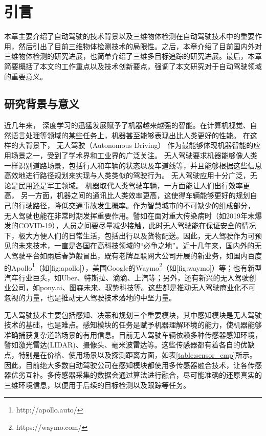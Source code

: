 \chapter{引言}
\label{ch:intro}

本章主要介绍了自动驾驶的技术背景以及三维物体检测在自动驾驶技术中的重要作用，然后引出了目前三维物体检测技术的局限性。之后，本章介绍了目前国内外对三维物体检测的研究进展，也简单介绍了三维多目标追踪的研究进展。最后，本章简要概括了本文的工作重点以及技术创新要点，强调了本文研究对于自动驾驶领域的重要意义。

\section{研究背景与意义}
\label{sec:background}
近几年来， 深度学习的迅猛发展赋予了机器越来越强的智能。在计算机视觉、自然语言处理等领域的某些任务上，机器甚至能够表现出比人类更好的性能\cite{he2016deep,DevlinBERT}。 在这样的大背景下， 无人驾驶（Autonomous Driving） 作为最能够体现机器智能的应用场景之一，受到了学术界和工业界的广泛关注。 无人驾驶要求机器能够像人类一样识别道路场景，包括行人和车辆的状态以及车道线等，并且能够根据这些信息高效地进行路径规划来实现与人类类似的驾驶行为。 无人驾驶应用十分广泛，无论是民用还是军工领域。 机器取代人类驾驶车辆，一方面能让人们出行效率更高， 另一方面，机器之间的通讯比人类效率更高，这使得车辆能够更好的规划自己的行驶路径，降低交通事故发生概率。作为智慧城市的不可缺少的组成部分， 无人驾驶也能在非常时期发挥重要作用。譬如在面对重大传染病时（如2019年末爆发的COVID-19），人员之间要尽量减少接触，此时无人驾驶能在保证安全的情况下，极大方便人们的日常生活，包括出行以及货物配送。因此，无人驾驶作为可预见的未来技术，一直是各国在高科技领域的“必争之地”。近十几年来，国内外的无人驾驶平台如雨后春笋般冒出，既有老牌互联网大公司开展的新业务，如国内百度的Apollo\footnote[1]{http://apollo.auto/}（如\figurename \ref{fig:apollo}），美国Google的Waymo\footnote[2]{https://waymo.com/}（如\figurename \ref{fig:waymo}）等；也有新型汽车行业巨头，如Uber、特斯拉、滴滴、上汽等；另外，还有新兴的无人驾驶创业公司，如pony.ai、图森未来、驭势科技等。这些都是推动无人驾驶商业化不可忽视的力量，也是推动无人驾驶技术落地的中坚力量。



无人驾驶技术主要包括感知、决策和规划三个重要模块，其中感知模块是无人驾驶技术的基础，也是难点。感知模块的任务是赋予机器理解环境的能力，使机器能够准确捕获复杂道路场景的有用信息。目前无人驾驶车辆依赖多种传感器感知环境， 譬如激光雷达(LIDAR)、摄像头、毫米波雷达等。这些传感器都有着各自的优缺点，特别是在价格、使用场景以及探测距离方面，如表\ref{table:sensor_cmp}所示。因此，目前绝大多数自动驾驶公司在感知模块都使用多传感器融合技术，让各传感器优劣互补。多传感器采集的数据会通过算法进行融合，尽可能准确的还原真实的三维环境信息，以便用于后续的目标检测以及跟踪等任务。

